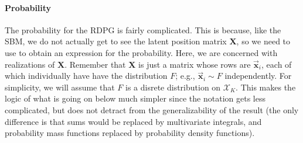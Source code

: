 \documentclass[letterpaper,10pt,english]{jupyterBook}
\begin{document}
\paragraph{Probability}
\label{\detokenize{representations/ch5/single-network-models_theory:id5}}
\sphinxAtStartPar
The probability for the  RDPG is fairly complicated. This is because, like the  SBM, we do not actually get to see the latent position matrix \(\mathbf X\), so we need to use  to obtain an expression for the probability. Here, we are concerned with realizations of \(\mathbf X\). Remember that \(\mathbf X\) is just a matrix whose rows are \(\vec {\mathbf x}_i\), each of which individually have have the distribution \(F\); e.g., \(\vec{\mathbf x}_i \sim F\) independently. For simplicity, we will assume that \(F\) is a disrete distribution on \(\mathcal X_K\). This makes the logic of what is going on below much simpler since the notation gets less complicated, but does not detract from the generalizability of the result (the only difference is that sums would be replaced by multivariate integrals, and probability mass functions replaced by probability density functions).
\end{document}
